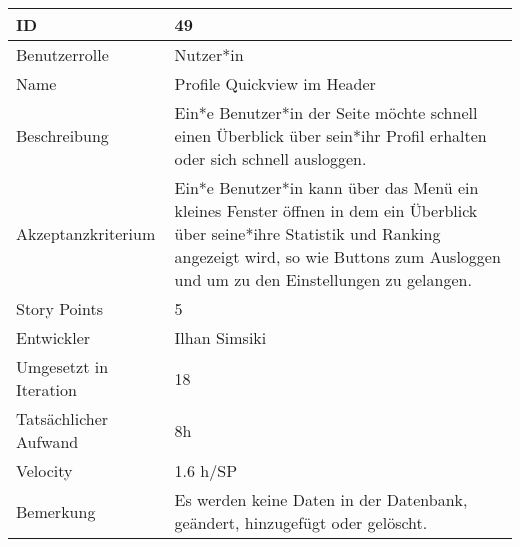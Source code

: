 \begin{tabularx}{\textwidth}{|p{}|X|}
	\hline
	ID & 49\\
	\hline
	Benutzerrolle & Nutzer*in\\
	\hline
	Name & Profile Quickview im Header\\
	\hline
	Beschreibung & Ein*e Benutzer*in der Seite möchte schnell einen Überblick über sein*ihr Profil erhalten oder sich schnell ausloggen.\\
	\hline
	Akzeptanzkriterium & Ein*e Benutzer*in kann über das Menü ein kleines Fenster öffnen in dem ein Überblick über seine*ihre Statistik und Ranking angezeigt wird, so wie Buttons zum Ausloggen und um zu den Einstellungen zu gelangen.\\
	\hline
	Story Points & 5\\
	\hline
	Entwickler & Ilhan Simsiki\\
	\hline
	Umgesetzt in Iteration & 18\\
	\hline
	Tatsächlicher Aufwand & 8h\\
	\hline
	Velocity & 1.6 h/SP \\
	\hline
	Bemerkung & Es werden keine Daten in der Datenbank, geändert, hinzugefügt oder gelöscht.\\
	\hline
\end{tabularx}
\vspace{20pt}
